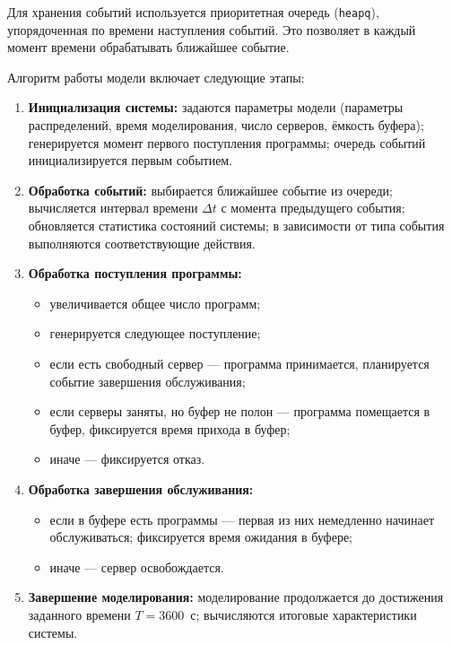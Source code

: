 \documentclass[14pt,a4paper]{extarticle}
\begin{document}
Для хранения событий используется приоритетная очередь (\texttt{heapq}),
упорядоченная по времени наступления событий. Это позволяет в каждый момент
времени обрабатывать ближайшее событие.

Алгоритм работы модели включает следующие этапы:

\begin{enumerate}
  \item \textbf{Инициализация системы:} задаются параметры модели (параметры
        распределений, время моделирования, число серверов, ёмкость буфера);
        генерируется момент первого поступления программы; очередь событий
        инициализируется первым событием.

  \item \textbf{Обработка событий:} выбирается ближайшее событие из очереди;
        вычисляется интервал времени $\Delta t$ с момента предыдущего события;
        обновляется статистика состояний системы; в зависимости от типа события
        выполняются соответствующие действия.

  \item \textbf{Обработка поступления программы:}
        \begin{itemize}
          \item увеличивается общее число программ;
          \item генерируется следующее поступление;
          \item если есть свободный сервер --- программа принимается, планируется
                событие завершения обслуживания;
          \item если серверы заняты, но буфер не полон --- программа помещается
                в буфер, фиксируется время прихода в буфер;
          \item иначе --- фиксируется отказ.
        \end{itemize}

  \item \textbf{Обработка завершения обслуживания:}
        \begin{itemize}
          \item если в буфере есть программы --- первая из них немедленно
                начинает обслуживаться; фиксируется время ожидания в буфере;
          \item иначе --- сервер освобождается.
        \end{itemize}

  \item \textbf{Завершение моделирования:} моделирование продолжается до
        достижения заданного времени $T = 3600$~с; вычисляются итоговые
        характеристики системы.
\end{enumerate}
\end{document}
